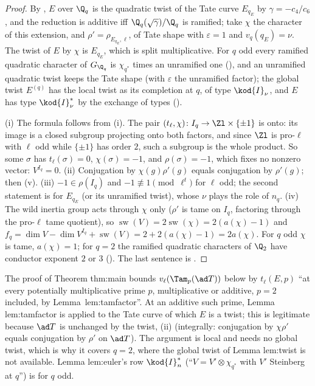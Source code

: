 \begin{proof}
By , $E$ over $\Q_q$ is the quadratic twist of the Tate curve $E_{q_E}$ by $\gamma=-c_4/c_6$, and the reduction is additive iff
$\Q_q(\sqrt\gamma)/\Q_q$ is ramified; take $\chi$ the character of this extension, and $\rho'=\rho_{E_{q_E},\ell}$, of Tate shape with $\varepsilon=1$ and
$v_q(q_E)=\nu$. The twist of $E$ by $\chi$ is $E_{q_E}$, which is split multiplicative. For $q$ odd every ramified quadratic character of $G_{\Q_q}$ is
$\chi_{q^*}$ times an unramified one (), and an unramified quadratic twist keeps the Tate shape (with $\varepsilon$ the unramified
factor); the global twist $E^{(q)}$ has the local twist as its completion at $q$, of type $\kod{I}_\nu$, and $E$ has type $\kod{I}_\nu^*$ by the
exchange of types ().

(i) The formula follows from (i). The pair $(t_\ell,\chi)\colon I_q\to\Zl\times\{\pm1\}$ is onto: its image is a closed subgroup
projecting onto both factors, and since $\Zl$ is pro-$\ell$ with $\ell$ odd while $\{\pm1\}$ has order $2$, such a subgroup is the whole product. So
some $\sigma$ has $t_\ell(\sigma)=0$, $\chi(\sigma)=-1$, and $\rho(\sigma)=-1$, which fixes no nonzero vector: $V^{I_q}=0$. (ii) Conjugation by $\chi(g)\rho'(g)$ equals
conjugation by $\rho'(g)$; then (v). (iii) $-1\in\rho(I_q)$ and $-1\not\equiv1\pmod{\ell^t}$ for $\ell$ odd; the second statement is
 for $E_{q_E}$ (or its unramified twist), whose $\nu$ plays the role of $n_q$. (iv) The wild inertia group acts
through $\chi$ only ($\rho'$ is tame on $I_q$, factoring through the pro-$\ell$ tame quotient), so $\operatorname{sw}(V)=2\operatorname{sw}(\chi)=2(a(\chi)-1)$ and
$f_q=\dim V-\dim V^{I_q}+\operatorname{sw}(V)=2+2(a(\chi)-1)=2a(\chi)$. For $q$ odd $\chi$ is tame, $a(\chi)=1$; for $q=2$ the ramified quadratic characters of
$\Q_2$ have conductor exponent $2$ or $3$ (). The last sentence is .
\end{proof}

\begin{paperlink}
The proof of Theorem thm:main bounds $v_\ell(\Tam_p(\ad T))$ below by $t_\ell(E,p)$ ``at every potentially multiplicative prime $p$,
multiplicative or additive, $p=2$ included, by Lemma~lem:tamfactor''. At an additive such prime, Lemma lem:tamfactor is applied to the
Tate curve of which $E$ is a twist; this is legitimate because $\ad T$ is unchanged by the twist, (ii) (integrally:
conjugation by $\chi\rho'$ equals conjugation by $\rho'$ on $\ad T$). The argument is local and needs no global twist, which is why it covers
$q=2$, where the global twist of Lemma lem:twist is not available. Lemma lem:euler's row $\kod{I}_n^*$ (``$V=V'\otimes\chi_{q^*}$ with $V'$ Steinberg
at $q$'') is  for $q$ odd.
\end{paperlink}

